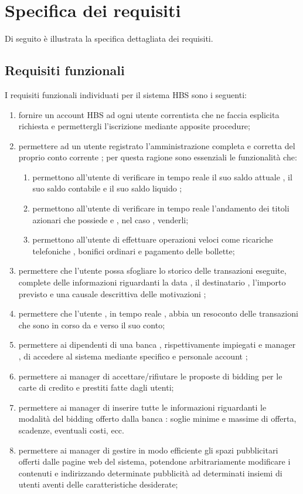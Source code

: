 
\section{Specifica dei requisiti}

Di seguito \`e illustrata la specifica dettagliata dei requisiti.

\subsection{Requisiti funzionali}

I requisiti funzionali individuati per il sistema HBS sono i seguenti:

\begin{enumerate}
	\item fornire un account HBS ad ogni utente correntista che ne faccia esplicita richiesta e permettergli l'iscrizione mediante apposite procedure;
	\item permettere ad un utente registrato l'amministrazione completa e corretta del proprio conto corrente ; per questa ragione sono essenziali le funzionalità che:
	\begin{enumerate}
		\item permettono all'utente di verificare in tempo reale il suo saldo attuale , il suo saldo contabile e il suo saldo liquido ;
		\item permettono all'utente di verificare in tempo reale l'andamento dei titoli azionari che possiede e , nel caso , venderli;
		\item permettono all'utente di effettuare operazioni veloci come ricariche telefoniche , bonifici ordinari e pagamento delle bollette;
	\end{enumerate}

	\item permettere che l'utente possa sfogliare lo storico delle transazioni eseguite, complete delle informazioni riguardanti la data , il destinatario , l'importo previsto e una causale descrittiva delle motivazioni ;
\item permettere che l'utente , in tempo reale , abbia un resoconto delle transazioni che sono in corso da e verso il suo conto;

	\item permettere ai dipendenti di una banca , rispettivamente impiegati e manager , di accedere al sistema mediante specifico e personale account ;

	\item permettere ai manager di accettare/rifiutare le proposte di bidding per le carte di credito e prestiti fatte dagli utenti;
	\item permettere ai manager di inserire tutte le informazioni riguardanti le modalità del bidding offerto dalla banca : soglie minime e massime di offerta, scadenze, eventuali costi, ecc.
	\item permettere ai manager di gestire in modo efficiente gli spazi pubblicitari offerti dalle pagine web del sistema, potendone arbitrariamente modificare i contenuti e indirizzando determinate pubblicità ad determinati insiemi di utenti aventi delle caratteristiche desiderate;


\end{enumerate}
